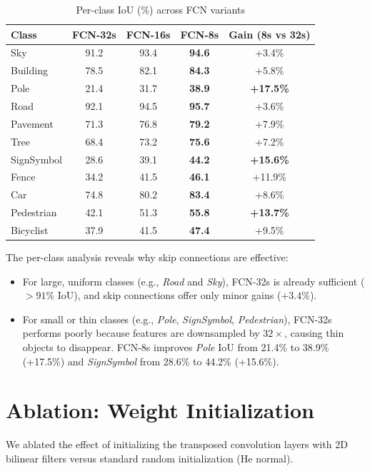 \documentclass[conference]{IEEEtran}
\begin{document}
\begin{table}[htbp]
\caption{Per-class IoU (\%) across FCN variants}
\label{tab:class_iou}
\centering
\small
\begin{tabular}{lcccc}
\toprule
\textbf{Class} & \textbf{FCN-32s} & \textbf{FCN-16s} & \textbf{FCN-8s} & \textbf{Gain (8s vs 32s)} \\
\midrule
Sky            & 91.2 & 93.4 & \textbf{94.6} & +3.4\% \\
Building       & 78.5 & 82.1 & \textbf{84.3} & +5.8\% \\
Pole           & 21.4 & 31.7 & \textbf{38.9} & \textbf{+17.5\%} \\
Road           & 92.1 & 94.5 & \textbf{95.7} & +3.6\% \\
Pavement       & 71.3 & 76.8 & \textbf{79.2} & +7.9\% \\
Tree           & 68.4 & 73.2 & \textbf{75.6} & +7.2\% \\
SignSymbol     & 28.6 & 39.1 & \textbf{44.2} & \textbf{+15.6\%} \\
Fence          & 34.2 & 41.5 & \textbf{46.1} & +11.9\% \\
Car            & 74.8 & 80.2 & \textbf{83.4} & +8.6\% \\
Pedestrian     & 42.1 & 51.3 & \textbf{55.8} & \textbf{+13.7\%} \\
Bicyclist      & 37.9 & 41.5 & \textbf{47.4} & +9.5\% \\
\bottomrule
\end{tabular}
\end{table}

The per-class analysis reveals why skip connections are effective:
\begin{itemize}
    \item For large, uniform classes (e.g., \textit{Road} and \textit{Sky}), FCN-32s is already sufficient ($>91\%$ IoU), and skip connections offer only minor gains ($+3.4\%$).
    \item For small or thin classes (e.g., \textit{Pole}, \textit{SignSymbol}, \textit{Pedestrian}), FCN-32s performs poorly because features are downsampled by $32\times$, causing thin objects to disappear. FCN-8s improves \textit{Pole} IoU from 21.4\% to 38.9\% (+17.5\%) and \textit{SignSymbol} from 28.6\% to 44.2\% (+15.6\%).
\end{itemize}

\section{Ablation: Weight Initialization}
We ablated the effect of initializing the transposed convolution layers with 2D bilinear filters versus standard random initialization (He normal).
\end{document}
